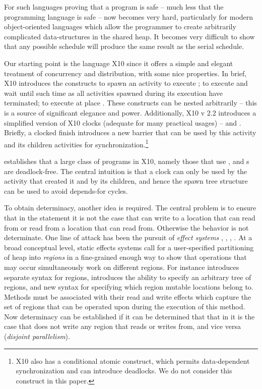 For such languages proving that a program is safe -- much less that
the programming language is safe -- now becomes very hard,
particularly for modern object-oriented languages which allow the
programmer to create arbitrarily complicated data-structures in the
shared heap. It becomes very difficult to show that any possible
schedule will produce the same result as the serial schedule.

Our starting point is the language X10 \cite{x10} since it offers a
simple and elegant treatment of concurrency and distribution, with
some nice properties.  In brief, X10
introduces the constructs  to spawn an activity to
execute ;  to execute  and wait until
such time as all activities spawned during its execution have
terminated;  to execute  at place
. These constructs can be nested arbitrarily -- this is a
source of significant elegance and power. Additionally, X10 v 2.2
introduces a simplified version of X10 clocks (adequate for many
practical usages) --  and . Briefly, a clocked finish introduces a new barrier that can be
used by this activity and its children activities for
synchronization.\footnote{X10 also has a conditional atomic construct,
   which permits data-dependent synchronization and
  can introduce deadlocks. We do not consider this construct in this paper.}

\cite{vj-clock} establishes that a large class of programs
in X10, namely those that use ,  and
s are deadlock-free. The central intuition is that a clock
can only be used by the activity that created it and by its children,
and hence the spawn tree structure can be used to avoid depends-for
cycles.

To obtain determinacy, another idea is required. The central problem
is to ensure that in the statement  it is not the
case that  can write to a location that  can read
from or read from a location that  can read from. Otherwise
the behavior is not determinate. One line of attack has been the pursuit
of {\em effect systems} \cite{Lucassen:1988:PES:73560.73564},
\cite{Leino:2002:UDG:543552.512559},
\cite{boyland:01interdependence},
\cite{DPJ}. At a broad conceptual level, static effects systems call
for a user-specified partitioning of heap into {\em regions} in a
fine-grained enough way to show that operations that may occur
simultaneously work on different regions. For instance \cite{DPJ}
introduces separate syntax for regions, introduces the ability to
specify an arbitrary tree of regions, and new syntax for specifying
which region mutable locations belong to. Methods must be associated
with their read and write effects which capture the set of regions
that can be operated upon during the execution of this
method. Now determinacy can be established if it can be determined
that that in  it is the case that  does
not write any region that  reads or writes from, and vice
versa ({\em disjoint parallelism}).

